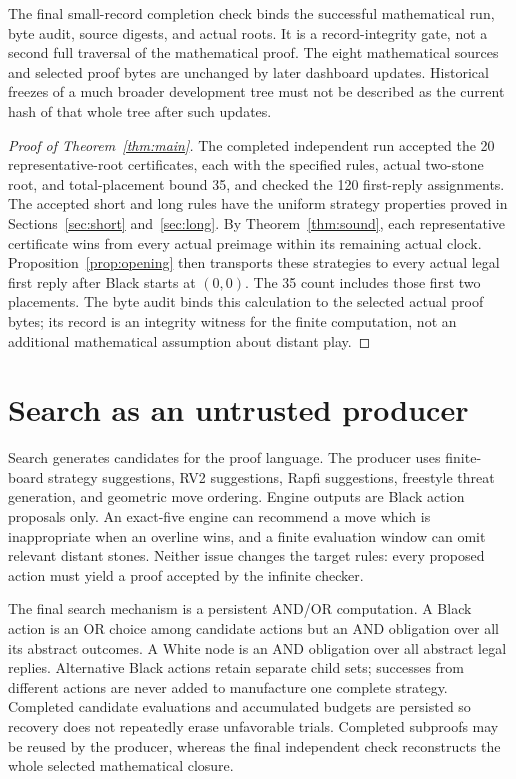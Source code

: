 \documentclass[11pt]{article}
\theoremstyle{definition}
\theoremstyle{remark}
\begin{document}
The final small-record completion check binds the successful mathematical
run, byte audit, source digests, and actual roots. It is a record-integrity
gate, not a second full traversal of the mathematical proof. The eight
mathematical sources and selected proof bytes are unchanged by later
dashboard updates. Historical freezes of a much broader development tree
must not be described as the current hash of that whole tree after such
updates.

\begin{proof}[Proof of Theorem~\ref{thm:main}]
The completed independent run accepted the 20 representative-root
certificates, each with the specified rules, actual two-stone root,
and total-placement bound 35, and checked the 120 first-reply assignments.
The accepted short and long rules have the uniform strategy properties
proved in Sections~\ref{sec:short} and~\ref{sec:long}. By
Theorem~\ref{thm:sound}, each representative certificate wins from every
actual preimage within its remaining actual clock. Proposition~\ref{prop:opening}
then transports these strategies to every actual legal first reply after
Black starts at $(0,0)$. The 35 count includes those first two placements.
The byte audit binds this calculation to the selected actual proof bytes;
its record is an integrity witness for the finite computation, not an
additional mathematical assumption about distant play.
\end{proof}

\section{Search as an untrusted producer}
\label{sec:search}
Search generates candidates for the proof language. The producer uses
finite-board strategy suggestions, RV2 suggestions, Rapfi suggestions,
freestyle threat generation, and geometric move ordering. Engine outputs
are Black action proposals only. An exact-five engine can recommend a
move which is inappropriate when an overline wins, and a finite evaluation
window can omit relevant distant stones. Neither issue changes the target
rules: every proposed action must yield a proof accepted by the infinite
checker.

The final search mechanism is a persistent AND/OR computation. A Black
action is an OR choice among candidate actions but an AND obligation over
all its abstract outcomes. A White node is an AND obligation over all
abstract legal replies. Alternative Black actions retain separate child
sets; successes from different actions are never added to manufacture one
complete strategy. Completed candidate evaluations and accumulated budgets
are persisted so recovery does not repeatedly erase unfavorable trials.
Completed subproofs may be reused by the producer, whereas the final
independent check reconstructs the whole selected mathematical closure.
\end{document}
